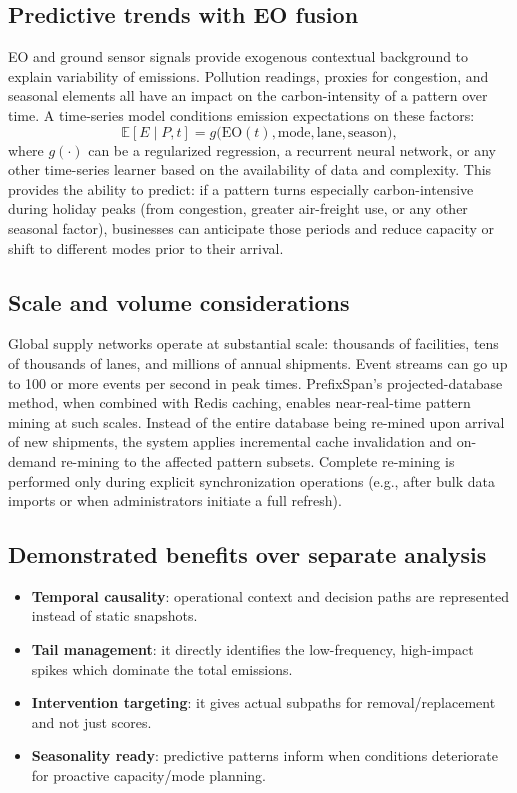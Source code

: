 \documentclass[conference]{IEEEtran}
\begin{document}
\subsection{Predictive trends with EO fusion}
EO and ground sensor signals provide exogenous contextual background to explain variability of emissions. Pollution readings, proxies for congestion, and seasonal elements all have an impact on the carbon-intensity of a pattern over time. A time-series model conditions emission expectations on these factors:
\begin{equation}
\mathbb{E}[E\mid P,t] = g\big(\text{EO}(t),\text{mode},\text{lane},\text{season}\big),
\end{equation}
where $g(\cdot)$ can be a regularized regression, a recurrent neural network, or any other time-series learner based on the availability of data and complexity. This provides the ability to predict: if a pattern turns especially carbon-intensive during holiday peaks (from congestion, greater air-freight use, or any other seasonal factor), businesses can anticipate those periods and reduce capacity or shift to different modes prior to their arrival.

\subsection{Scale and volume considerations}
Global supply networks operate at substantial scale: thousands of facilities, tens of thousands of lanes, and millions of annual shipments. Event streams can go up to 100 or more events per second in peak times. PrefixSpan's projected-database method, when combined with Redis caching, enables near-real-time pattern mining at such scales. Instead of the entire database being re-mined upon arrival of new shipments, the system applies incremental cache invalidation and on-demand re-mining to the affected pattern subsets. Complete re-mining is performed only during explicit synchronization operations (e.g., after bulk data imports or when administrators initiate a full refresh).

\subsection{Demonstrated benefits over separate analysis}
\begin{itemize}
  \item \textbf{Temporal causality}: operational context and decision paths are represented instead of static snapshots.
  \item \textbf{Tail management}: it directly identifies the low-frequency, high-impact spikes which dominate the total emissions.
  \item \textbf{Intervention targeting}: it gives actual subpaths for removal/replacement and not just scores.
  \item \textbf{Seasonality ready}: predictive patterns inform when conditions deteriorate for proactive capacity/mode planning.
\end{itemize}
\end{document}
